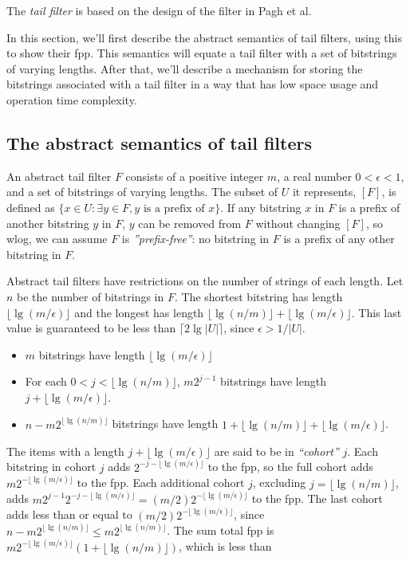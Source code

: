 \documentclass[11pt,letterpaper]{article}
\begin{document}
The {\em tail filter} is based on the design of the filter in Pagh et al.~\cite{DBLP:journals/corr/abs-1304-1188}

In this section, we'll first describe the abstract semantics of tail filters, using this to show their fpp.
This semantics will equate a tail filter with a set of bitstrings of varying lengths.
After that, we'll describe a mechanism for storing the bitstrings associated with a tail filter in a way that has low space usage and operation time complexity.

\subsection{The abstract semantics of tail filters}

An abstract tail filter $F$ consists of a positive integer $m$, a real number $0 < \epsilon < 1$, and a set of bitstrings of varying lengths. %
The subset of $U$ it represents, $[F]$, is defined as $\{x \in U : \exists y \in F, y \textrm{ is a prefix of } x\}$.
If any bitstring $x$ in $F$ is a prefix of another bitstring $y$ in $F$, $y$ can be removed from $F$ without changing $[F]$, so wlog, we can assume $F$ is {\em ''prefix-free''}: no bitstring in $F$ is a prefix of any other bitstring in $F$.


Abstract tail filters have restrictions on the number of strings of each length.
Let $n$ be the number of bitstrings in $F$.
The shortest bitstring has length $\lfloor \lg (m / \epsilon) \rfloor$ and the longest has length $\lfloor \lg (n/m) \rfloor + \lfloor \lg (m / \epsilon) \rfloor$.
This last value is guaranteed to be less than $\lceil 2 \lg |U| \rceil$, since $\epsilon > 1/|U|$.

\begin {itemize}
\item $m$ bitstrings have length $\lfloor \lg (m / \epsilon) \rfloor$
\item For each $0 < j < \lfloor \lg (n/m) \rfloor $, $m2^{j-1}$ bitstrings have length $j + \lfloor \lg (m / \epsilon) \rfloor$.
\item $n - m2^{\lfloor \lg (n/m) \rfloor}$ bitstrings have length $1 + \lfloor \lg (n/m) \rfloor  + \lfloor \lg (m / \epsilon) \rfloor$.
\end {itemize}

The items with a length $j + \lfloor \lg (m / \epsilon) \rfloor$ are said to be in {\em ``cohort''} $j$.
Each bitstring in cohort $j$ adds $2^{- j - \lfloor \lg (m / \epsilon) \rfloor}$ to the fpp, so the full cohort adds $m2^{- \lfloor \lg (m / \epsilon) \rfloor}$ to the fpp.
Each additional cohort $j$, excluding $j = \lfloor \lg (n/m) \rfloor$, adds $m 2^{j-1} 2^{-j - \lfloor \lg (m / \epsilon) \rfloor} = (m/2) 2^{-\lfloor \lg (m / \epsilon) \rfloor}$ to the fpp.
The last cohort adds less than or equal to $(m/2) 2^{-\lfloor \lg (m / \epsilon) \rfloor}$, since $n - m 2^{\lfloor \lg (n/m) \rfloor} \leq m 2^{\lfloor \lg(n/m)\rfloor}$.
The sum total fpp is $m 2^{- \lfloor \lg (m / \epsilon) \rfloor} (1 + \lfloor \lg (n/m) \rfloor)$, which is less than
\end{document}
